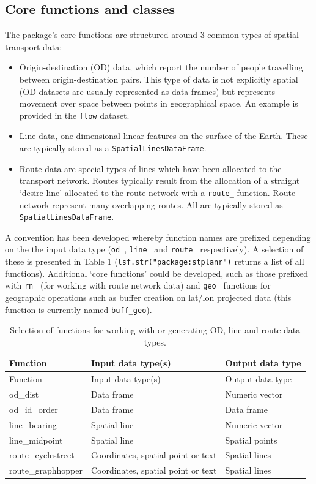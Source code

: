 \subsection{Core functions and
classes}\label{core-functions-and-classes}

The package's core functions are structured around 3 common types of
spatial transport data:

\begin{itemize}
\tightlist
\item
  Origin-destination (OD) data, which report the number of people
  travelling between origin-destination pairs. This type of data is not
  explicitly spatial (OD datasets are usually represented as data
  frames) but represents movement over space between points in
  geographical space. An example is provided in the \texttt{flow}
  dataset.
\item
  Line data, one dimensional linear features on the surface of the
  Earth. These are typically stored as a \texttt{SpatialLinesDataFrame}.
\item
  Route data are special types of lines which have been allocated to the
  transport network. Routes typically result from the allocation of a
  straight `desire line' allocated to the route network with a
  \texttt{route\_} function. Route network represent many overlapping
  routes. All are typically stored as \texttt{SpatialLinesDataFrame}.
\end{itemize}

A convention has been developed whereby function names are
prefixed depending on the the input data type
(\texttt{od\_}, \texttt{line\_} and
\texttt{route\_} respectively). A selection of these is presented in
Table 1 (\texttt{lsf.str("package:stplanr")} returns a list of all functions).
Additional `core functions' could be developed, such as those
prefixed with \texttt{rn\_} (for working with route network data) and
\texttt{geo\_} functions for geographic operations such as buffer creation
on lat/lon projected data (this function is currently named
\texttt{buff\_geo}).

\begin{longtable}[]{@{}lll@{}}
\caption{Selection of functions for working with or generating OD, line
and route data types.}\tabularnewline
\toprule
Function & Input data type(s) & Output data type\tabularnewline
\midrule
\endfirsthead
\toprule
Function & Input data type(s) & Output data type\tabularnewline
\midrule
\endhead
od\_dist & Data frame & Numeric vector\tabularnewline
od\_id\_order & Data frame & Data frame\tabularnewline
line\_bearing & Spatial line & Numeric vector\tabularnewline
line\_midpoint & Spatial line & Spatial points\tabularnewline
route\_cyclestreet & Coordinates, spatial point or text & Spatial
lines\tabularnewline
route\_graphhopper & Coordinates, spatial point or text & Spatial
lines\tabularnewline
\bottomrule
\end{longtable}

